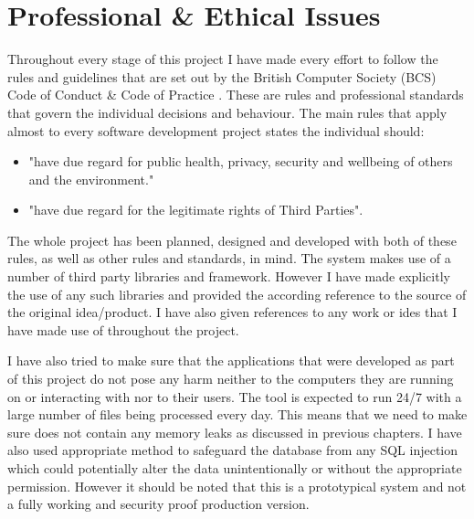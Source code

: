 \chapter{Professional \& Ethical Issues}
Throughout every stage of this project I have made every effort to follow the rules and guidelines that are set out by the British Computer Society (BCS) Code of Conduct \& Code of Practice \cite{bcsCodeOfConduct}. These are rules and professional standards that govern the individual decisions and behaviour. The main rules that apply almost to every software development project states the individual should:
\begin{itemize}
	\item "have due regard for public health, privacy, security and wellbeing of others and
the environment."\cite{bcsCodeOfConduct}
	\item "have due regard for the legitimate rights of Third Parties"\cite{bcsCodeOfConduct}.
\end{itemize}

The whole project has been planned, designed and developed with both of these rules, as well as other rules and standards, in mind. The system makes use of a number of third party libraries and framework. However I have made explicitly the use of any such libraries and provided the according reference to the source of the original idea/product. I have also given references to any work or ides that I have made use of throughout the project.

I have also tried to make sure that the applications that were developed as part of this project do not pose any harm neither to the computers they are running on or interacting with nor to their users. The tool is expected to run 24/7 with a large number of files being processed every day. This means that we need to make sure does not contain any memory leaks as discussed in previous chapters. I have also used appropriate method to safeguard the database from any SQL injection \cite{Su2006} which could potentially alter the data unintentionally or without the appropriate permission. However it should be noted that this is a prototypical system and not a fully working and security proof production version.